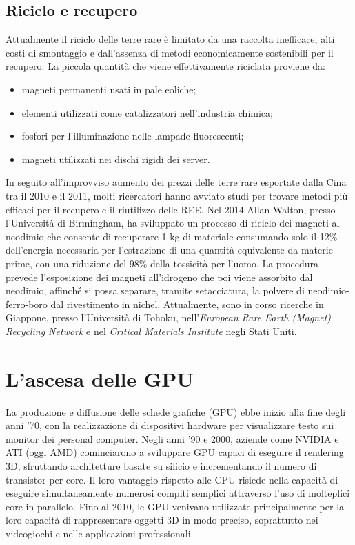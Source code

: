 \documentclass[12pt,a4paper,oneside]{book}
\begin{document}
\section{Riciclo e recupero}
Attualmente il riciclo delle terre rare è limitato da una raccolta inefficace, alti costi di smontaggio e dall'assenza di metodi economicamente sostenibili per il recupero.
La piccola quantità che viene effettivamente riciclata proviene da:
\begin{itemize}
	\item magneti permanenti usati in pale eoliche;
	\item elementi utilizzati come catalizzatori nell'industria chimica;
	\item fosfori per l'illuminazione nelle lampade fluorescenti;
	\item magneti utilizzati nei dischi rigidi dei server.
\end{itemize}

In seguito all'improvviso aumento dei prezzi delle terre rare esportate dalla Cina tra il 2010 e il 2011, molti ricercatori hanno avviato studi per trovare metodi più efficaci per il recupero e il riutilizzo delle REE.
Nel 2014 Allan Walton, presso l'Università di Birmingham, ha sviluppato un processo di riciclo dei magneti al neodimio che consente di recuperare 1 kg di materiale consumando solo il 12\% dell'energia necessaria per l'estrazione di una quantità equivalente da materie prime, con una riduzione del 98\% della tossicità per l'uomo. La procedura prevede l'esposizione dei magneti all'idrogeno che poi viene assorbito dal neodimio, affinché si possa separare, tramite setacciatura, la polvere di neodimio-ferro-boro dal rivestimento in nichel.
Attualmente, sono in corso ricerche in Giappone, presso l'Università di Tohoku, nell'\textit{European Rare Earth (Magnet) Recycling Network} e nel \textit{Critical Materials Institute} negli Stati Uniti.

\chapter{L'ascesa delle GPU}
La produzione e diffusione delle schede grafiche (GPU) ebbe inizio alla fine degli anni '70, con la realizzazione di dispositivi hardware per visualizzare testo sui monitor dei personal computer. Negli anni '90 e 2000, aziende come NVIDIA e ATI (oggi AMD) cominciarono a sviluppare GPU capaci di eseguire il rendering 3D, sfruttando architetture basate su silicio e incrementando il numero di transistor per core. Il loro vantaggio rispetto alle CPU risiede nella capacità di eseguire simultaneamente numerosi compiti semplici attraverso l'uso di molteplici core in parallelo. Fino al 2010, le GPU venivano utilizzate principalmente per la loro capacità di rappresentare oggetti 3D in modo preciso, soprattutto nei videogiochi e nelle applicazioni professionali.
\end{document}
